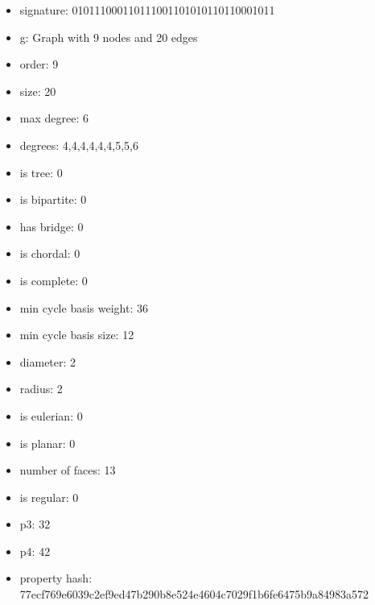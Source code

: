 \newpage
\begin{figure}
\end{figure}
\begin{itemize}
\item signature: 010111000110111001101010110110001011
\item g: Graph with 9 nodes and 20 edges
\item order: 9
\item size: 20
\item max degree: 6
\item degrees: 4,4,4,4,4,4,5,5,6
\item is tree: 0
\item is bipartite: 0
\item has bridge: 0
\item is chordal: 0
\item is complete: 0
\item min cycle basis weight: 36
\item min cycle basis size: 12
\item diameter: 2
\item radius: 2
\item is eulerian: 0
\item is planar: 0
\item number of faces: 13
\item is regular: 0
\item p3: 32
\item p4: 42
\item property hash: 77ecf769e6039c2ef9ed47b290b8e524e4604c7029f1b6fe6475b9a84983a572
\end{itemize}

